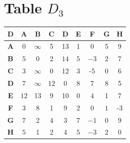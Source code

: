\documentclass{article}
\begin{document}
\section{Table $D_{3}$}
\begin{center}
    \begin{tabular}{|c||c|c|c|c|c|c|c|c|}
        \hline
        \textbf{D} & \textbf{A} & \textbf{B} & \textbf{C} & \textbf{D} & \textbf{E} & \textbf{F} & \textbf{G} & \textbf{H} \\
        \hline
        \hline
        \textbf{A}& 0 & $\infty$ & 5 & 13 & 1 & \cellcolor[HTML]{D74894}$0$ & 5 & 9 \\
        \hline
        \textbf{B}& \cellcolor[HTML]{D74894}$5$ & 0 & 2 & \cellcolor[HTML]{D74894}$14$ & \cellcolor[HTML]{D74894}$5$ & \cellcolor[HTML]{D74894}$-3$ & \cellcolor[HTML]{D74894}$2$ & 7 \\
        \hline
        \textbf{C}& 3 & $\infty$ & 0 & 12 & 3 & -5 & 0 & 6 \\
        \hline
        \textbf{D}& 7 & $\infty$ & 12 & 0 & 8 & \cellcolor[HTML]{D74894}$7$ & 8 & 5 \\
        \hline
        \textbf{E}& \cellcolor[HTML]{D74894}$12$ & 13 & 9 & 10 & 0 & \cellcolor[HTML]{D74894}$4$ & 1 & 7 \\
        \hline
        \textbf{F}& 3 & 8 & 1 & 9 & 2 & 0 & \cellcolor[HTML]{D74894}$1$ & -3 \\
        \hline
        \textbf{G}& \cellcolor[HTML]{D74894}$7$ & 2 & 4 & 3 & \cellcolor[HTML]{D74894}$7$ & \cellcolor[HTML]{D74894}$-1$ & 0 & 9 \\
        \hline
        \textbf{H}& \cellcolor[HTML]{D74894}$5$ & 1 & 2 & 4 & \cellcolor[HTML]{D74894}$5$ & \cellcolor[HTML]{D74894}$-3$ & \cellcolor[HTML]{D74894}$2$ & 0 \\
        \hline
    \end{tabular}
\end{center}
\end{document}

